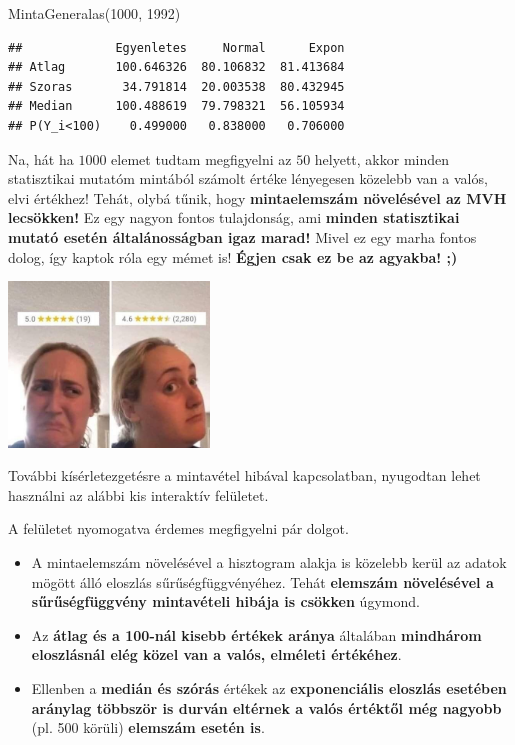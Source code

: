 \documentclass[
]{book}
\newenvironment{Shaded}{\begin{snugshade}}{\end{snugshade}}
\newcommand{\DecValTok}[1]{\textcolor[rgb]{0.00,0.00,0.81}{#1}}
\newcommand{\NormalTok}[1]{#1}
\providecommand{\tightlist}{%
  \setlength{\itemsep}{0pt}\setlength{\parskip}{0pt}}
\begin{document}
\begin{Shaded}
\begin{Highlighting}[]
\NormalTok{MintaGeneralas(}\DecValTok{1000}\NormalTok{, }\DecValTok{1992}\NormalTok{)}
\end{Highlighting}
\end{Shaded}

\begin{verbatim}
##             Egyenletes     Normal      Expon
## Atlag       100.646326  80.106832  81.413684
## Szoras       34.791814  20.003538  80.432945
## Median      100.488619  79.798321  56.105934
## P(Y_i<100)    0.499000   0.838000   0.706000
\end{verbatim}

Na, hát ha \(1000\) elemet tudtam megfigyelni az \(50\) helyett, akkor minden statisztikai mutatóm mintából számolt értéke lényegesen közelebb van a valós, elvi értékhez! Tehát, olybá tűnik, hogy \textbf{mintaelemszám növelésével az MVH lecsökken!} Ez egy nagyon fontos tulajdonság, ami \textbf{minden statisztikai mutató esetén általánosságban igaz marad!}
Mivel ez egy marha fontos dolog, így kaptok róla egy mémet is! \textbf{Égjen csak ez be az agyakba! ;)}

\includegraphics[width=0.4\textwidth,height=\textheight]{sample_size.jpg}

További kísérletezgetésre a mintavétel hibával kapcsolatban, nyugodtan lehet használni az alábbi kis interaktív felületet.

A felületet nyomogatva érdemes megfigyelni pár dolgot.

\begin{itemize}
\tightlist
\item
  A mintaelemszám növelésével a hisztogram alakja is közelebb kerül az adatok mögött álló eloszlás sűrűségfüggvényéhez. Tehát \textbf{elemszám növelésével a sűrűségfüggvény mintavételi hibája is csökken} úgymond.
\item
  Az \textbf{átlag és a 100-nál kisebb értékek aránya} általában \textbf{mindhárom eloszlásnál elég közel van a valós, elméleti értékéhez}.
\item
  Ellenben a \textbf{medián és szórás} értékek az \textbf{exponenciális eloszlás esetében aránylag többször is durván eltérnek a valós értéktől még nagyobb} (pl. 500 körüli) \textbf{elemszám esetén is}.
\end{itemize}
\end{document}
